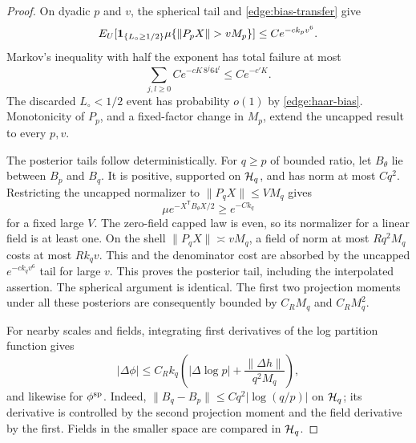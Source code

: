 \begin{proof}
On dyadic \(p\) and \(v\), the spherical tail and
\eqref{edge:bias-transfer} give
\[
 E_U[\ind_{\{L_\circ\ge1/2\}}
       \mu\{\|P_pX\|>vM_p\}]
       \le C e^{-c k_pv^6}.
\]
Markov's inequality with half the exponent has total failure at most
\[
 \sum_{j,l\ge0}C e^{-cK\,8^j64^l}\le C e^{-c'K}.
\]
The discarded \(L_\circ<1/2\) event has probability \(o(1)\) by
\eqref{edge:haar-bias}.  Monotonicity of \(P_p\), and a fixed-factor
change in \(M_p\), extend the uncapped result to every \(p,v\).

The posterior tails follow deterministically.  For \(q\ge p\) of bounded
ratio, let \(B_\theta\) lie between \(B_p\) and \(B_q\).  It is positive,
supported on \(\mathcal H_q\), and has norm at most \(Cq^2\).  Restricting the
uncapped normalizer to \(\|P_qX\|\le VM_q\) gives
\[
 \mu e^{-X^{\mathsf T}B_\theta X/2}\ge e^{-Ck_q}
\]
for a fixed large \(V\).  The zero-field capped law is even, so its
normalizer for a linear field is at least one.  On the shell
\(\|P_qX\|\asymp vM_q\), a field of norm at most \(Rq^2M_q\) costs
at most \(Rk_qv\).  This and the denominator cost are absorbed by
the uncapped \(e^{-c k_qv^6}\) tail for large \(v\).  This proves the
posterior tail, including the interpolated assertion.  The spherical
argument is identical.  The first two projection moments under all
these posteriors are consequently bounded by \(C_RM_q\) and \(C_RM_q^2\).

For nearby scales and fields, integrating first derivatives of the log
partition function gives
\begin{equation}\label{edge:potential-interpolation}
 |\Delta\phi|\le C_Rk_q\left(
       |\Delta\log p|+\frac{\|\Delta h\|}{q^2M_q}\right),
\end{equation}
and likewise for \(\phi^{\rm sp}\).  Indeed,
\(\|B_q-B_p\|\le Cq^2|\log(q/p)|\) on \(\mathcal H_q\); its derivative is
controlled by the second projection moment and the field derivative
by the first.  Fields in the smaller space are compared in \(\mathcal H_q\).


\end{proof}
